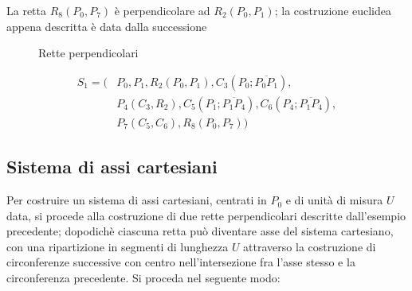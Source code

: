 \noindent 
La retta  $R_{8}(P_{0}, P_{7})$ è perpendicolare ad $R_{2}(P_{0}, P_{1})$; 
la costruzione euclidea appena descritta è data dalla successione 


\begin{figure}[!h]
\begin{center}
\caption{Rette perpendicolari}
\end{center}
\end{figure}


\begin{align*}
S_{1} = ( &P_{0}, P_{1}, R_{2}(P_{0}, P_{1}), C_{3}(P_{0};\overline{P_{0} P_{1}}), \\
&P_{4}(C_{3}, R_{2} ), C_{5}(P_{1};\overline{P_{1} P_{4}}), C_{6}(P_{4};\overline{P_{1} P_{4}}),\\
&P_{7}(C_{5}, C_{6} ), R_{8}(P_{0}, P_{7}) )
\end{align*}




\subsection{Sistema di assi cartesiani} \label{carte}
Per costruire un sistema di assi cartesiani, centrati in $P_{0}$ e di unità di misura $U$ data, si procede alla costruzione di due rette perpendicolari descritte dall'esempio precedente; dopodichè ciascuna retta può diventare asse del sistema cartesiano, con una ripartizione in segmenti di lunghezza $U$ attraverso la costruzione di circonferenze successive con centro nell'intersezione fra l'asse stesso e la circonferenza precedente. Si proceda nel seguente modo:

